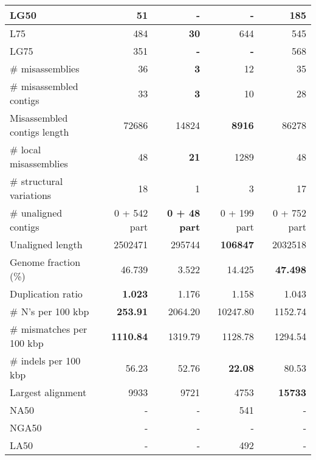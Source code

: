 \documentclass[12pt,a4paper]{article}
\begin{document}
\begin{table}[ht]
\begin{center}
\begin{tabular}{|l*{4}{|r}|}
LG50 & 51 & {\bf -} & {\bf -} & 185 \\ \hline
L75 & 484 & {\bf 30} & 644 & 545 \\ \hline
LG75 & 351 & {\bf -} & {\bf -} & 568 \\ \hline
\# misassemblies & 36 & {\bf 3} & 12 & 35 \\ \hline
\# misassembled contigs & 33 & {\bf 3} & 10 & 28 \\ \hline
Misassembled contigs length & 72686 & 14824 & {\bf 8916} & 86278 \\ \hline
\# local misassemblies & 48 & {\bf 21} & 1289 & 48 \\ \hline
\# structural variations & 18 & 1 & 3 & 17 \\ \hline
\# unaligned contigs & 0 + 542 part & {\bf 0 + 48 part} & 0 + 199 part & 0 + 752 part \\ \hline
Unaligned length & 2502471 & 295744 & {\bf 106847} & 2032518 \\ \hline
Genome fraction (\%) & 46.739 & 3.522 & 14.425 & {\bf 47.498} \\ \hline
Duplication ratio & {\bf 1.023} & 1.176 & 1.158 & 1.043 \\ \hline
\# N's per 100 kbp & {\bf 253.91} & 2064.20 & 10247.80 & 1152.74 \\ \hline
\# mismatches per 100 kbp & {\bf 1110.84} & 1319.79 & 1128.78 & 1294.54 \\ \hline
\# indels per 100 kbp & 56.23 & 52.76 & {\bf 22.08} & 80.53 \\ \hline
Largest alignment & 9933 & 9721 & 4753 & {\bf 15733} \\ \hline
NA50 & - & - & 541 & - \\ \hline
NGA50 & - & - & - & - \\ \hline
LA50 & - & - & 492 & - \\ \hline
\end{tabular}
\end{center}
\end{table}
\end{document}
